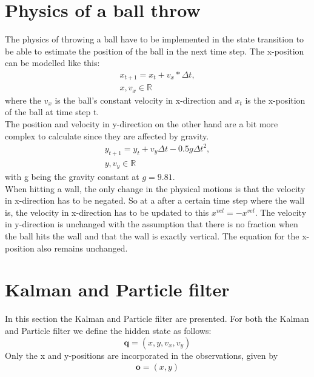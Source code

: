\documentclass[conference]{IEEEtran}
\begin{document}
\section{Physics of a ball throw}
The physics of throwing a ball have to be implemented in the state transition to be able to estimate the position of the ball in the next time step.  
The x-position can be modelled like this:
\begin{equation*}
    \begin{aligned}
    x_{t+1} = x_{t} + v_x * \Delta t,   \\
    x, v_x \in \mathbb{R}
    \end{aligned}
    \tag{1}
\end{equation*}
where the ${v_x}$ is the ball's constant velocity in x-direction and $x_t$ is the x-position of the ball at time step t. \\
The position and velocity in y-direction on the other hand are a bit more complex to calculate since they are affected by gravity.
\begin{equation*}
    \begin{aligned}
    y_{t+1} = y_t + v_y \Delta t - 0.5 g \Delta t^2, \\
    y, v_y \in \mathbb{R}
    \end{aligned}
    \tag{2}
\end{equation*}
with g being the gravity constant at $g = 9.81$. \\
When hitting a wall, the only change in the physical motions is that the velocity in x-direction has to be negated.
So at a after a certain time step where the wall is, the velocity in x-direction has to be updated to this $x^{vel} = -x^{vel}$.
The velocity in y-direction is unchanged with the assumption that there is no fraction when the ball hits the wall and that the wall is exactly vertical. 
The equation for the x-position also remains unchanged.


\section{Kalman and Particle filter}
In this section the Kalman and Particle filter are presented. 
For both the Kalman and Particle filter we define the hidden state as follows:
\begin{equation*}
\textbf{q} = (x, y, v_x, v_y)   \tag{3}
\end{equation*}
Only the x and y-positions are incorporated in the observations, given by
\begin{equation*}
    \begin{aligned}
    \textbf{o} = (x, y)
    \end{aligned}
\tag{4}
\end{equation*}
\end{document}
